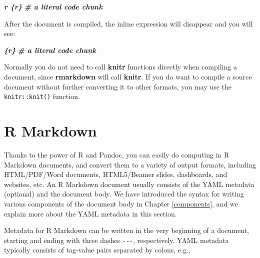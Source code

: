 \documentclass[
  12pt,
]{krantz}
\newenvironment{Shaded}{\begin{snugshade}}{\end{snugshade}}
\newcommand{\InformationTok}[1]{\textcolor[rgb]{0.56,0.35,0.01}{\textbf{\textit{#1}}}}
\theoremstyle{definition}
\theoremstyle{definition}
\theoremstyle{definition}
\theoremstyle{definition}
\theoremstyle{remark}
\begin{document}
\begin{Shaded}
\begin{Highlighting}[]
\InformationTok{\textasciigrave{}\textasciigrave{}\textasciigrave{}\textasciigrave{}}
\InformationTok{\textasciigrave{}r \textquotesingle{}\textquotesingle{}\textasciigrave{}\textasciigrave{}\textasciigrave{}\textasciigrave{}\{r\}}
\InformationTok{\# a literal code chunk}
\InformationTok{\textasciigrave{}\textasciigrave{}\textasciigrave{}}
\InformationTok{\textasciigrave{}\textasciigrave{}\textasciigrave{}\textasciigrave{}}
\end{Highlighting}
\end{Shaded}

After the document is compiled, the inline expression will disappear and you will see:

\begin{Shaded}
\begin{Highlighting}[]
\InformationTok{\textasciigrave{}\textasciigrave{}\textasciigrave{}\{r\}}
\InformationTok{\# a literal code chunk}
\InformationTok{\textasciigrave{}\textasciigrave{}\textasciigrave{}}
\end{Highlighting}
\end{Shaded}

Normally you do not need to call \textbf{knitr} functions directly when compiling a document, since \textbf{rmarkdown} will call \textbf{knitr}. If you do want to compile a source document without further converting it to other formats, you may use the \texttt{knitr::knit()} function.

\section{R Markdown}\label{r-markdown}

Thanks to the power of R and Pandoc, you can easily do computing in R Markdown documents, and convert them to a variety of output formats, including HTML/PDF/Word documents, HTML5/Beamer slides, dashboards, and websites, etc. An R Markdown document usually consists of the YAML metadata (optional) and the document body. We have introduced the syntax for writing various components of the document body in Chapter \ref{components}, and we explain more about the YAML metadata in this section.

Metadata for R Markdown can be written in the very beginning of a document, starting and ending with three dashes \texttt{-\/-\/-}, respectively. YAML metadata typically consists of tag-value pairs separated by colons, e.g.,
\end{document}
